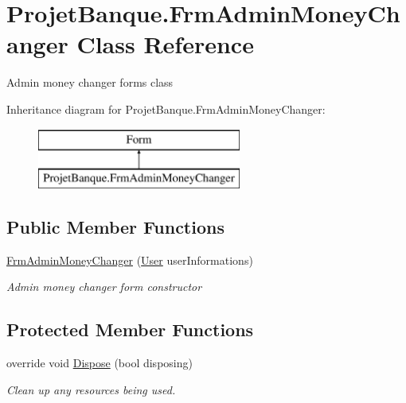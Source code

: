 \hypertarget{class_projet_banque_1_1_frm_admin_money_changer}{}\section{Projet\+Banque.\+Frm\+Admin\+Money\+Changer Class Reference}
\label{class_projet_banque_1_1_frm_admin_money_changer}


Admin money changer form\textquotesingle{}s class  


Inheritance diagram for Projet\+Banque.\+Frm\+Admin\+Money\+Changer\+:\begin{figure}[H]
\begin{center}
\leavevmode
\includegraphics[height=2.000000cm]{class_projet_banque_1_1_frm_admin_money_changer}
\end{center}
\end{figure}
\subsection*{Public Member Functions}
\begin{DoxyCompactItemize}
\item 
\mbox{\hyperlink{class_projet_banque_1_1_frm_admin_money_changer_a16499d6bd9b74e99da6601daf3f703e5}{Frm\+Admin\+Money\+Changer}} (\mbox{\hyperlink{class_projet_banque_1_1_user}{User}} user\+Informations)
\begin{DoxyCompactList}\small\item\em Admin money changer form constructor \end{DoxyCompactList}\end{DoxyCompactItemize}
\subsection*{Protected Member Functions}
\begin{DoxyCompactItemize}
\item 
override void \mbox{\hyperlink{class_projet_banque_1_1_frm_admin_money_changer_ab9648074593c735c2409f682a20b115e}{Dispose}} (bool disposing)
\begin{DoxyCompactList}\small\item\em Clean up any resources being used. \end{DoxyCompactList}\end{DoxyCompactItemize}


